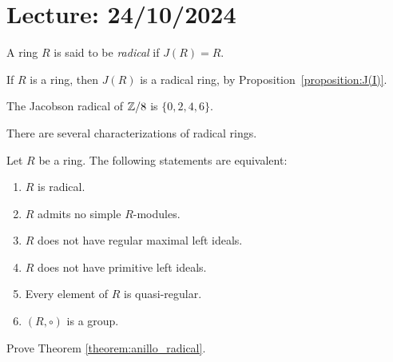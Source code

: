 \section{Lecture: 24/10/2024}

\begin{definition}
A ring $R$ is said to be \emph{radical} if $J(R)=R$. 
\end{definition}

\begin{example}
	If $R$ is a ring, then $J(R)$ is a radical ring, by Proposition~\ref{proposition:J(I)}.
\end{example}

\begin{example}
	The Jacobson radical of $\mathbb{Z}/8$ is $\{0,2,4,6\}$. 
\end{example}

There are several characterizations of radical rings. 

\begin{theorem}
	\label{theorem:anillo_radical}
	Let $R$ be a ring. The following statements are equivalent: 
	\begin{enumerate}
		\item $R$ is radical.
		\item $R$ admits no simple $R$-modules. 
		\item $R$ does not have regular maximal left ideals.
		\item $R$ does not have primitive left ideals.
		\item Every element of $R$ is quasi-regular. 
		\item $(R,\circ)$ is a group. 
	\end{enumerate}
\end{theorem}

\begin{exercise}
    Prove Theorem \ref{theorem:anillo_radical}. 
\end{exercise}
%    
%
%	
%	
%

